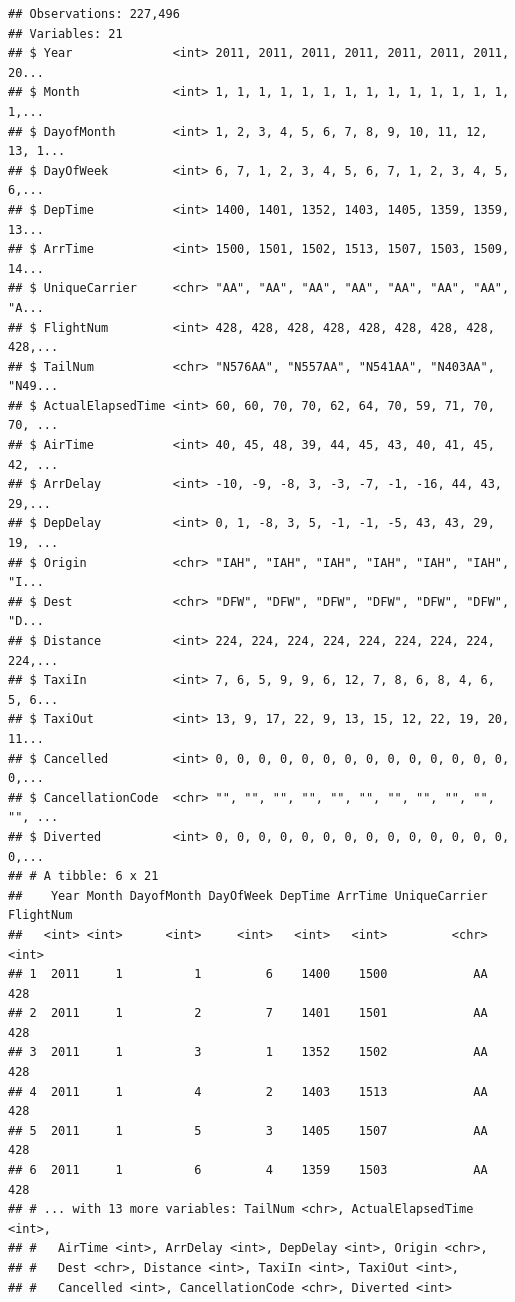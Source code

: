 \documentclass[]{book}
\theoremstyle{definition}
\theoremstyle{definition}
\theoremstyle{definition}
\theoremstyle{remark}
\begin{document}
\begin{verbatim}
## Observations: 227,496
## Variables: 21
## $ Year              <int> 2011, 2011, 2011, 2011, 2011, 2011, 2011, 20...
## $ Month             <int> 1, 1, 1, 1, 1, 1, 1, 1, 1, 1, 1, 1, 1, 1, 1,...
## $ DayofMonth        <int> 1, 2, 3, 4, 5, 6, 7, 8, 9, 10, 11, 12, 13, 1...
## $ DayOfWeek         <int> 6, 7, 1, 2, 3, 4, 5, 6, 7, 1, 2, 3, 4, 5, 6,...
## $ DepTime           <int> 1400, 1401, 1352, 1403, 1405, 1359, 1359, 13...
## $ ArrTime           <int> 1500, 1501, 1502, 1513, 1507, 1503, 1509, 14...
## $ UniqueCarrier     <chr> "AA", "AA", "AA", "AA", "AA", "AA", "AA", "A...
## $ FlightNum         <int> 428, 428, 428, 428, 428, 428, 428, 428, 428,...
## $ TailNum           <chr> "N576AA", "N557AA", "N541AA", "N403AA", "N49...
## $ ActualElapsedTime <int> 60, 60, 70, 70, 62, 64, 70, 59, 71, 70, 70, ...
## $ AirTime           <int> 40, 45, 48, 39, 44, 45, 43, 40, 41, 45, 42, ...
## $ ArrDelay          <int> -10, -9, -8, 3, -3, -7, -1, -16, 44, 43, 29,...
## $ DepDelay          <int> 0, 1, -8, 3, 5, -1, -1, -5, 43, 43, 29, 19, ...
## $ Origin            <chr> "IAH", "IAH", "IAH", "IAH", "IAH", "IAH", "I...
## $ Dest              <chr> "DFW", "DFW", "DFW", "DFW", "DFW", "DFW", "D...
## $ Distance          <int> 224, 224, 224, 224, 224, 224, 224, 224, 224,...
## $ TaxiIn            <int> 7, 6, 5, 9, 9, 6, 12, 7, 8, 6, 8, 4, 6, 5, 6...
## $ TaxiOut           <int> 13, 9, 17, 22, 9, 13, 15, 12, 22, 19, 20, 11...
## $ Cancelled         <int> 0, 0, 0, 0, 0, 0, 0, 0, 0, 0, 0, 0, 0, 0, 0,...
## $ CancellationCode  <chr> "", "", "", "", "", "", "", "", "", "", "", ...
## $ Diverted          <int> 0, 0, 0, 0, 0, 0, 0, 0, 0, 0, 0, 0, 0, 0, 0,...
## # A tibble: 6 x 21
##    Year Month DayofMonth DayOfWeek DepTime ArrTime UniqueCarrier FlightNum
##   <int> <int>      <int>     <int>   <int>   <int>         <chr>     <int>
## 1  2011     1          1         6    1400    1500            AA       428
## 2  2011     1          2         7    1401    1501            AA       428
## 3  2011     1          3         1    1352    1502            AA       428
## 4  2011     1          4         2    1403    1513            AA       428
## 5  2011     1          5         3    1405    1507            AA       428
## 6  2011     1          6         4    1359    1503            AA       428
## # ... with 13 more variables: TailNum <chr>, ActualElapsedTime <int>,
## #   AirTime <int>, ArrDelay <int>, DepDelay <int>, Origin <chr>,
## #   Dest <chr>, Distance <int>, TaxiIn <int>, TaxiOut <int>,
## #   Cancelled <int>, CancellationCode <chr>, Diverted <int>
\end{verbatim}
\end{document}
